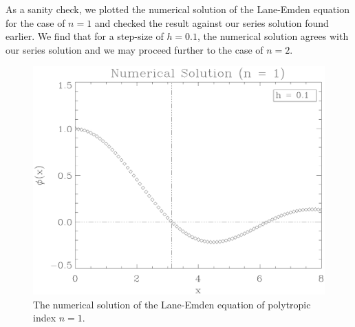 \documentclass[12pt, manuscript]{article}
\begin{document}
\noindent    As a sanity check, we plotted the numerical solution of the Lane-Emden equation for the case of $n = 1$ and checked the result against our series solution found earlier. We find that for a step-size of $h = 0.1$, the numerical solution agrees with our series solution and we may proceed further to the case of $n = 2$.
    \begin{figure}[H]
        \begin{center}
            \includegraphics[scale=0.58]{images/rk4plotn1.eps}
            \caption{The numerical solution of the Lane-Emden equation of polytropic index $n = 1$.}
            \label{fig:numplot2}
        \end{center}
    \end{figure}
\end{document}
